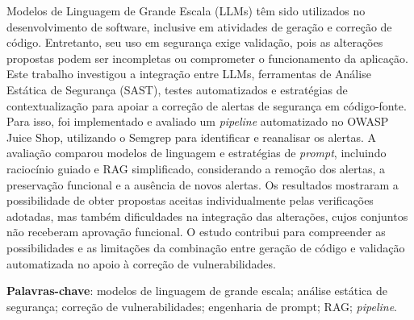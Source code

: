 \begin{resumo}
Modelos de Linguagem de Grande Escala (LLMs) têm sido utilizados no desenvolvimento de software, inclusive em atividades de geração e correção de código. Entretanto, seu uso em segurança exige validação, pois as alterações propostas podem ser incompletas ou comprometer o funcionamento da aplicação. Este trabalho investigou a integração entre LLMs, ferramentas de Análise Estática de Segurança (SAST), testes automatizados e estratégias de contextualização para apoiar a correção de alertas de segurança em código-fonte. Para isso, foi implementado e avaliado um \textit{pipeline} automatizado no OWASP Juice Shop, utilizando o Semgrep para identificar e reanalisar os alertas. A avaliação comparou modelos de linguagem e estratégias de \textit{prompt}, incluindo raciocínio guiado e RAG simplificado, considerando a remoção dos alertas, a preservação funcional e a ausência de novos alertas. Os resultados mostraram a possibilidade de obter propostas aceitas individualmente pelas verificações adotadas, mas também dificuldades na integração das alterações, cujos conjuntos não receberam aprovação funcional. O estudo contribui para compreender as possibilidades e as limitações da combinação entre geração de código e validação automatizada no apoio à correção de vulnerabilidades.

\textbf{Palavras-chave}: modelos de linguagem de grande escala; análise estática de segurança; correção de vulnerabilidades; engenharia de prompt; RAG; \textit{pipeline}.
\end{resumo}
